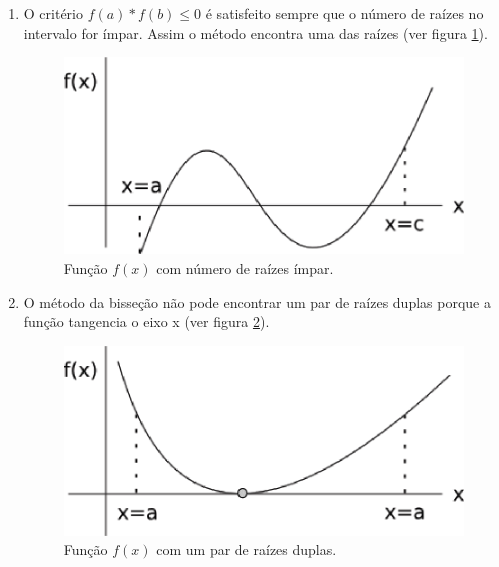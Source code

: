 \begin{enumerate}
 \item O critério $f(a) \ast f(b) \leq 0$ é satisfeito sempre que o número de raízes no intervalo for ímpar. Assim o método encontra uma das raízes (ver figura \ref{fig:bissecao2}).

\begin{figure}[htb]
  \setlength{\abovecaptionskip}{20pt}
  \centering
  \includegraphics[scale=0.8]{capitulos/capitulo1/figuras/bissecao2.eps}
  \caption{Função $f(x)$ com número de raízes ímpar.}
  \label{fig:bissecao2}
\end{figure}

\item O método da bisseção não pode encontrar um par de raízes duplas porque a função tangencia o eixo x (ver figura \ref{fig:bissecao3}).

\begin{figure}[htb]
  \setlength{\abovecaptionskip}{20pt}
  \centering
  \includegraphics[scale=0.8]{capitulos/capitulo1/figuras/bissecao3.eps}
  \caption{Função $f(x)$ com um par de raízes duplas.}
  \label{fig:bissecao3}
\end{figure}


\end{enumerate}

